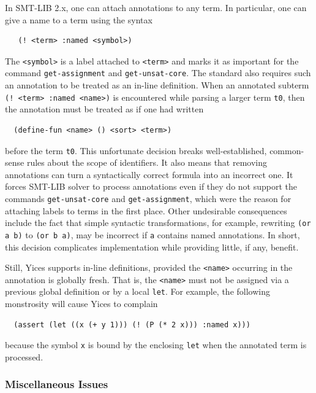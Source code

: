 \documentclass[11pt,twoside,fleqn,openright,titlepage]{cslreport}
\begin{document}
In SMT-LIB 2.x, one can attach annotations to any term. In particular,
one can give a name to a term using the syntax
\begin{small}
\begin{verbatim}
   (! <term> :named <symbol>)
\end{verbatim}
\end{small}
The \texttt{<symbol>} is a label attached to \texttt{<term>} and marks
it as important for the command \texttt{get-assignment} and
\texttt{get-unsat-core}.  The standard also requires such an
annotation to be treated as an in-line definition. When an annotated
subterm \texttt{(! <term> :named <name>)} is encountered while parsing
a larger term \texttt{t0}, then the annotation must be treated as if
one had written
\begin{small}
\begin{verbatim}
  (define-fun <name> () <sort> <term>)
\end{verbatim}
\end{small}
before the term \texttt{t0}. This unfortunate decision breaks
well-established, common-sense rules about the scope of
identifiers. It also means that removing annotations can turn a
syntactically correct formula into an incorrect one. It forces SMT-LIB
solver to process annotations even if they do not support the commands
\texttt{get-unsat-core} and \texttt{get-assignment}, which were the
reason for attaching labels to terms in the first place.  Other
undesirable consequences include the fact that simple syntactic
transformations, for example, rewriting \texttt{(or a b)} to
\texttt{(or b a)}, may be incorrect if \texttt{a} contains named
annotations.  In short, this decision complicates implementation
while providing little, if any, benefit.

\medskip\noindent Still, Yices supports in-line definitions, provided
the \texttt{<name>} occurring in the annotation is globally fresh. That
is, the \texttt{<name>} must not be assigned via a previous global
definition or by a local \texttt{let}.  For example, the following
monstrosity will cause Yices to complain
\begin{small}
\begin{verbatim}
  (assert (let ((x (+ y 1))) (! (P (* 2 x))) :named x)))
\end{verbatim}
\end{small}
because the symbol \texttt{x} is bound by the enclosing \texttt{let}
when the annotated term is processed.


\subsubsection*{Miscellaneous Issues}
\end{document}

